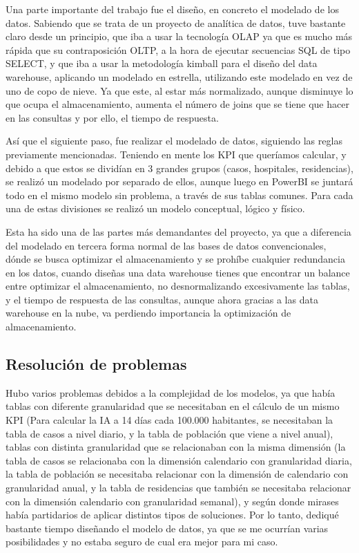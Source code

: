 Una parte importante del trabajo fue el diseño, en concreto el modelado de los datos. Sabiendo que se trata de un proyecto de analítica de datos, tuve bastante claro desde un principio, que iba a usar la tecnología OLAP ya que es mucho más rápida que su contraposición OLTP, a la hora de ejecutar secuencias SQL de tipo SELECT, y que iba a usar la metodología kimball para el diseño del data warehouse, aplicando un modelado en estrella, utilizando este modelado en vez de uno de copo de nieve. Ya que este, al estar más normalizado, aunque disminuye lo que ocupa el almacenamiento, aumenta el número de joins que se tiene que hacer en las consultas y por ello, el tiempo de respuesta.

Así que el siguiente paso, fue realizar el modelado de datos, siguiendo las reglas previamente mencionadas. Teniendo en mente los KPI que queríamos calcular,  y debido a que estos se dividían en 3 grandes grupos (casos, hospitales, residencias), se realizó un modelado por separado de ellos, aunque luego en PowerBI se juntará todo en el mismo modelo sin problema, a través de sus tablas comunes. Para cada una de estas divisiones se realizó un modelo conceptual, lógico y físico.

Esta ha sido una de las partes más demandantes del proyecto, ya que a diferencia del modelado en tercera forma normal de las bases de datos convencionales, dónde se busca optimizar el almacenamiento y se prohíbe cualquier redundancia en los datos, cuando diseñas una data warehouse tienes que encontrar un balance entre optimizar el almacenamiento, no desnormalizando excesivamente las tablas, y el tiempo de respuesta de las consultas, aunque ahora gracias a las data warehouse en la nube, va perdiendo importancia la optimización de almacenamiento.

\subsection{Resolución de problemas}

Hubo varios problemas debidos a la complejidad de los modelos, ya que había tablas con diferente granularidad que se necesitaban en el cálculo de un mismo KPI (Para calcular la IA a 14 días cada 100.000 habitantes, se necesitaban la tabla de casos a nivel diario, y la tabla de población que viene a nivel anual), tablas con distinta granularidad que se relacionaban con la misma dimensión (la tabla de casos se relacionaba con la dimensión calendario con granularidad diaria, la tabla de población se necesitaba relacionar con la dimensión de calendario con granularidad anual, y la tabla de residencias que también se necesitaba relacionar con la dimensión calendario con granularidad semanal), y según donde mirases había partidarios de aplicar distintos tipos de soluciones. Por lo tanto, dediqué bastante tiempo diseñando el modelo de datos, ya que se me ocurrían varias posibilidades y no estaba seguro de cual era mejor para mi caso.

